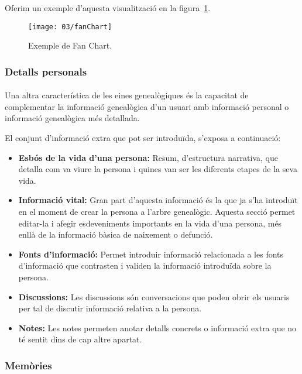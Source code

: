     Oferim un exemple d’aquesta visualització en la figura~\ref{fig:fanChart}.

    \begin{figure}
        \texttt{[image: 03/fanChart]}
        \centering
        \caption{Exemple de Fan Chart.\label{fig:fanChart}}
    \end{figure}


    \subsubsection{Detalls personals}

    \paragraph{}
    Una altra característica de les eines genealògiques és la capacitat de complementar la informació genealògica d'un usuari amb informació personal o informació genealògica més detallada.

    El conjunt d'informació extra que pot ser introduïda, s'exposa a continuació:

    \begin{itemize}
        \item \textbf{Esbós de la vida d'una persona:} Resum, d’estructura narrativa, que detalla com va viure la persona i quines van ser les diferents etapes de la seva vida.
        \item \textbf{Informació vital:} Gran part d’aquesta informació és la que ja s’ha introduït en el moment de crear la persona a l’arbre genealògic. Aquesta secció permet editar-la i afegir esdeveniments importants en la vida d’una persona, més enllà de la informació bàsica de naixement o defunció.
        \item \textbf{Fonts d’informació:} Permet introduir informació relacionada a les fonts d’informació que contrasten i validen la informació introduïda sobre la persona.
        \item \textbf{Discussions:} Les discussions són conversacions que poden obrir els usuaris per tal de discutir informació relativa a la persona.
        \item \textbf{Notes:} Les notes permeten anotar detalls concrets o informació extra que no té sentit dins de cap altre apartat.
    \end{itemize}


    \subsubsection{Memòries}

